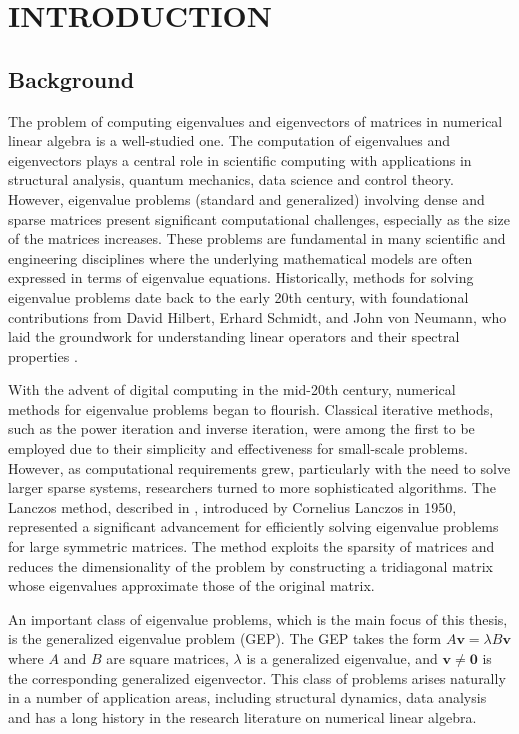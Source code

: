 \chapter{INTRODUCTION}

\section{Background}\label{sec:Background}

The problem of computing eigenvalues and eigenvectors of matrices in numerical linear algebra is a well-studied one. The computation of eigenvalues and eigenvectors plays a central role in scientific computing with applications in structural analysis, quantum mechanics, data science and control theory. However, eigenvalue problems (standard and generalized) involving dense and sparse matrices present significant computational challenges, especially as the size of the matrices increases. These problems are fundamental in many scientific and engineering disciplines where the underlying mathematical models are often expressed in terms of eigenvalue equations. Historically, methods for solving eigenvalue problems date back to the early 20th century, with foundational contributions from David Hilbert, Erhard Schmidt, and John von Neumann, who laid the groundwork for understanding linear operators and their spectral properties \cite{GOLUB200035}.

With the advent of digital computing in the mid-20th century, numerical methods for eigenvalue problems began to flourish. Classical iterative methods, such as the power iteration and inverse iteration, were among the first to be employed due to their simplicity and effectiveness for small-scale problems. However, as computational requirements grew, particularly with the need to solve larger sparse systems, researchers turned to more sophisticated algorithms. The Lanczos method, described in \cite{Lanczos:1950zz}, introduced by Cornelius Lanczos in 1950,
represented a significant advancement for efficiently solving eigenvalue problems for large symmetric matrices. The method exploits the sparsity of matrices and reduces the dimensionality of the problem by constructing a tridiagonal matrix whose eigenvalues approximate those of the original matrix.

An important class of eigenvalue problems, which is the main focus of this thesis, is the generalized eigenvalue problem {} (GEP). The GEP takes the form $A\mathbf{v} = \lambda B\mathbf{v}$ where $A$ and $B$ are square matrices, $\lambda$ is a generalized eigenvalue, and $\mathbf{v}\neq\mathbf{0}$ is the corresponding generalized eigenvector. This class of problems arises naturally in a number of application areas, including structural dynamics, data analysis and has a long history in the research literature on numerical linear algebra.

